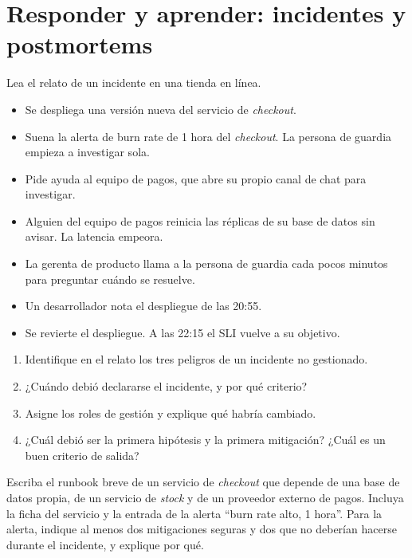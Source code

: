 \documentclass[variant=guia,cover=institutional,mode=screen]{ua-engineering-v6-article}
\begin{document}
\section{Responder y aprender: incidentes y postmortems}
\begin{uaexercise}
Lea el relato de un incidente en una tienda en línea.
\begin{itemize}[leftmargin=3.6em, labelsep=0.6em]
\item[20:55] Se despliega una versión nueva del servicio de \emph{checkout}.
\item[21:10] Suena la alerta de burn rate de 1 hora del \emph{checkout}. La persona de guardia empieza a investigar sola.
\item[21:25] Pide ayuda al equipo de pagos, que abre su propio canal de chat para investigar.
\item[21:30] Alguien del equipo de pagos reinicia las réplicas de su base de datos sin avisar. La latencia empeora.
\item[21:35] La gerenta de producto llama a la persona de guardia cada pocos minutos para preguntar cuándo se resuelve.
\item[22:00] Un desarrollador nota el despliegue de las 20:55.
\item[22:05] Se revierte el despliegue. A las 22:15 el SLI vuelve a su objetivo.
\end{itemize}
\begin{enumerate}
\item Identifique en el relato los tres peligros de un incidente no gestionado.
\item ¿Cuándo debió declararse el incidente, y por qué criterio?
\item Asigne los roles de gestión y explique qué habría cambiado.
\item ¿Cuál debió ser la primera hipótesis y la primera mitigación? ¿Cuál es un buen criterio de salida?
\end{enumerate}
\end{uaexercise}

\begin{uaexercise}
Escriba el runbook breve de un servicio de \emph{checkout} que depende de una base de datos propia, de un servicio de \emph{stock} y de un proveedor externo de pagos. Incluya la ficha del servicio y la entrada de la alerta ``burn rate alto, 1 hora''. Para la alerta, indique al menos dos mitigaciones seguras y dos que no deberían hacerse durante el incidente, y explique por qué.
\end{uaexercise}
\end{document}
